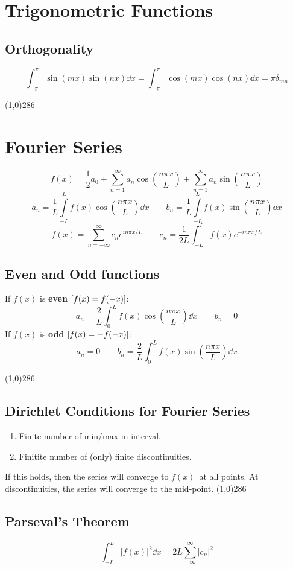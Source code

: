 \documentclass[10pt,a4paper]{article}
\renewcommand{\b}{\textbf}
\renewcommand{\exp}{e^}
\newcommand{\oneinfsum}{\sum_{n=1}^{\infty}}
\newcommand{\holine}{\line(1,0){286}}
\newcommand{\half}{\frac{1}{2}}
\begin{document}
\begin{multicols}{2}
\section*{Trigonometric Functions}
\subsection*{Orthogonality}
\[
    \int_{-\pi}^\pi \sin(mx)\sin(nx) \dd{x} = \int_{-\pi}^\pi \cos(mx)\cos(nx) \dd{x} = \pi \delta_{mn}
\]


\holine
\section*{Fourier Series}
\[
    f(x) = \half a_0 + \oneinfsum a_n\cos(\frac{n\pi x}{L}) + \oneinfsum a_n\sin(\frac{n\pi x}{L})
\]
\[
    a_n = \frac{1}{L}\int\limits_{-L}^{L}f(x) \cos(\frac{n\pi x}{L}) \dd{x} \quad\quad
    b_n = \frac{1}{L}\int\limits_{-L}^{L}f(x) \sin(\frac{n\pi x}{L}) \dd{x}
\]
\[
    f(x) = \sum_{n=-\infty}^{\infty} c_n \exp{in\pi x/L}  \quad\quad
    c_n = \frac{1}{2L}\int_{-L}^L f(x) \exp{-in\pi x/L}
\]

\subsection*{Even and Odd functions}
If $f(x)$ is \b{even} $\qty[f(x) = f(-x)]$:
\[
    a_n = \frac{2}{L}\int_0^L f(x)\cos(\frac{n\pi x}{L}) \dd{x} \quad\quad b_n = 0
\]
If $f(x)$ is \b{odd} $\qty[f(x) = -f(-x)]$:
\[
    a_n = 0 \quad\quad b_n = \frac{2}{L}\int_0^L f(x)\sin(\frac{n\pi x}{L}) \dd{x}
\]


\holine 
\subsection*{Dirichlet Conditions for Fourier Series}
\begin{enumerate}
    \item Finite number of min/max in interval.
    \item Finitite number of (only) finite discontinuities.
\end{enumerate}
If this holds, then the series will converge to $f(x)$ at all points. At discontinuities, the series will converge to the mid-point.
\holine
\subsection*{Parseval's Theorem}
\[
    \int_{-L}^L |f(x)|^2 \dd{x} = 2L\sum_{-\infty}^\infty |c_n|^2
\]




\end{multicols}
\end{document}

